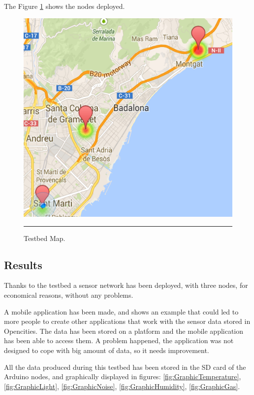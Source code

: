 \documentclass[12pt, a4paper,twoside]{tesi_upf}
\begin{document}
    The Figure \ref{fig:Testbedmap} shows the nodes deployed.
    \begin{figure}[htbp]
      \centering
          \includegraphics[scale=0.2]{./Figures/Testbedmap.png}
          \\
          \rule{15em}{0.5pt}
      \caption[Testbed Map]{Testbed Map.}
      \label{fig:Testbedmap}
    \end{figure}
    
    \subsection{Results}
      
      Thanks to the testbed a sensor network has been deployed, with three nodes, for economical reasons, without any problems.    
      
      A mobile application has been made, and shows an example that could led to more people to create other applications that work with the sensor data stored in Opencities. 
      The data has been stored on a platform and the mobile application has been able to access them. A problem happened, the application was not designed to cope with big amount of data, so it needs improvement.

      All the data produced during this testbed has been stored in the SD card of the Arduino nodes, and graphically displayed in figures: \ref{fig:GraphicTemperature}, \ref{fig:GraphicLight}, \ref{fig:GraphicNoise}, \ref{fig:GraphicHumidity}, \ref{fig:GraphicGas}.
\end{document}
